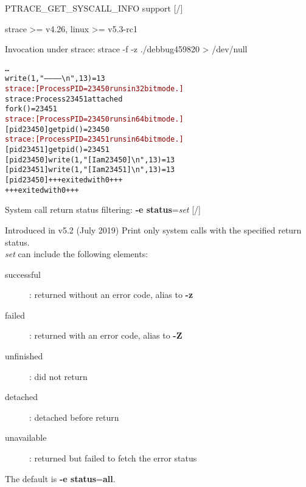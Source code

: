 \documentclass[unicode,aspectratio=169,xcolor={table,dvipsnames,usernames}]{beamer}
\begin{document}
\begin{frame}[fragile]{PTRACE\_GET\_SYSCALL\_INFO support \hfill [\insertframenumber/\inserttotalframenumber]}

{\Large strace >= v4.26, linux >= v5.3-rc1}
\begin{block}{Invocation under strace: strace -f -z ./debbug459820 > /dev/null}
\begin{alltt}
\ldots
write(1, "------------{\textbackslash}n", 13)          = 13
\textcolor{darkred}{strace: [ Process PID=23450 runs in 32 bit mode. ]}
strace: Process 23451 attached
fork()                                  = 23451
\textcolor{darkred}{strace: [ Process PID=23450 runs in 64 bit mode. ]}
[pid 23450] getpid()                    = 23450
\textcolor{darkred}{strace: [ Process PID=23451 runs in 64 bit mode. ]}
[pid 23451] getpid()                    = 23451
[pid 23450] write(1, "[I am 23450]{\textbackslash}n", 13) = 13
[pid 23451] write(1, "[I am 23451]{\textbackslash}n", 13) = 13
[pid 23450] +++ exited with 0 +++
+++ exited with 0 +++
\end{alltt}
\end{block}
\end{frame}
\begin{frame}{System call return status filtering: \textbf{-e status}=\textit{set} \hfill [\insertframenumber/\inserttotalframenumber]}
\Large
\begin{block}{Introduced in v5.2 (July 2019)}
\large
Print only system calls with the specified return status. \\
\textit{set} can include the following elements:
\begin{description}
	\item[successful]: returned without an error code, alias to \textbf{-z}
	\item[failed]: returned with an error code, alias to \textbf{-Z}
	\item[unfinished]: did not return
	\item[detached]: detached before return
	\item[unavailable]: returned but failed to fetch the error status
\end{description}
\end{block}
The default is \textbf{-e status}=\textbf{all}.
\end{frame}
\end{document}
